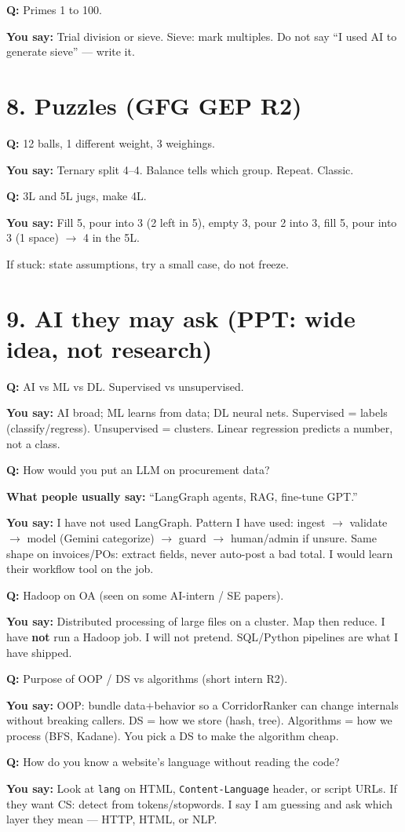 \documentclass[a4paper,9.5pt]{extarticle}
\newcommand{\Q}[1]{\par\vspace{1.5pt}\noindent\textcolor{hot}{\textbf{Q:} #1}\par}
\newcommand{\Typ}[1]{\noindent\textcolor{muted}{\textbf{What people usually say:} #1}\par}
\newcommand{\Say}[1]{\noindent\textcolor{ok}{\textbf{You say:} #1}\par}
\begin{document}
\Q{Primes 1 to 100.}
\Say{Trial division or sieve. Sieve: mark multiples. Do not say ``I used AI to generate sieve'' --- write it.}

\section{8. Puzzles (GFG GEP R2)}
\Q{12 balls, 1 different weight, 3 weighings.}
\Say{Ternary split 4--4. Balance tells which group. Repeat. Classic.}

\Q{3L and 5L jugs, make 4L.}
\Say{Fill 5, pour into 3 (2 left in 5), empty 3, pour 2 into 3, fill 5, pour into 3 (1 space) $\to$ 4 in the 5L.}

If stuck: state assumptions, try a small case, do not freeze.

\section{9. AI they may ask (PPT: wide idea, not research)}
\Q{AI vs ML vs DL. Supervised vs unsupervised.}
\Say{AI broad; ML learns from data; DL neural nets. Supervised = labels (classify/regress). Unsupervised = clusters. Linear regression predicts a number, not a class.}

\Q{How would you put an LLM on procurement data?}
\Typ{``LangGraph agents, RAG, fine-tune GPT.''}
\Say{I have not used LangGraph. Pattern I have used: ingest $\to$ validate $\to$ model (Gemini categorize) $\to$ guard $\to$ human/admin if unsure. Same shape on invoices/POs: extract fields, never auto-post a bad total. I would learn their workflow tool on the job.}

\Q{Hadoop on OA (seen on some AI-intern / SE papers).}
\Say{Distributed processing of large files on a cluster. Map then reduce. I have \textbf{not} run a Hadoop job. I will not pretend. SQL/Python pipelines are what I have shipped.}

\Q{Purpose of OOP / DS vs algorithms (short intern R2).}
\Say{OOP: bundle data+behavior so a CorridorRanker can change internals without breaking callers. DS = how we store (hash, tree). Algorithms = how we process (BFS, Kadane). You pick a DS to make the algorithm cheap.}

\Q{How do you know a website's language without reading the code?}
\Say{Look at \texttt{lang} on HTML, \texttt{Content-Language} header, or script URLs. If they want CS: detect from tokens/stopwords. I say I am guessing and ask which layer they mean --- HTTP, HTML, or NLP.}
\end{document}
